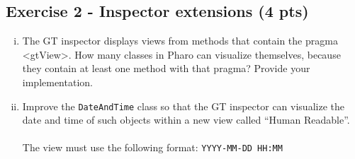 \documentclass [11pt, a4wide, twoside]{article}
\begin{document}
\subsection*{Exercise 2 - Inspector extensions (4 pts)}
\begin{enumerate}[i)]
\item The GT inspector displays views from methods that contain the pragma \textless gtView\textgreater. How many classes in Pharo can visualize themselves, because they contain at least one method with that pragma? Provide your implementation.
\item Improve the \texttt{DateAndTime} class so that the GT inspector can visualize the date and time of such objects within a new view called ``Human Readable''.\\\\The view must use the following format: 
\texttt{YYYY-MM-DD HH:MM}
\end{enumerate}

\end{document}
